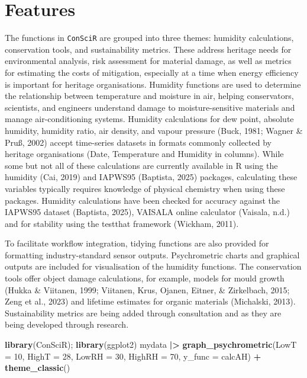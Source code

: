 \documentclass[
]{article}
\newenvironment{Shaded}{\begin{snugshade}}{\end{snugshade}}
\newcommand{\AttributeTok}[1]{\textcolor[rgb]{0.13,0.29,0.53}{#1}}
\newcommand{\DecValTok}[1]{\textcolor[rgb]{0.00,0.00,0.81}{#1}}
\newcommand{\FunctionTok}[1]{\textcolor[rgb]{0.13,0.29,0.53}{\textbf{#1}}}
\newcommand{\NormalTok}[1]{#1}
\newcommand{\SpecialCharTok}[1]{\textcolor[rgb]{0.81,0.36,0.00}{\textbf{#1}}}
\begin{document}
\section{Features}\label{features}

The functions in \texttt{ConSciR} are grouped into three themes:
humidity calculations, conservation tools, and sustainability metrics.
These address heritage needs for environmental analysis, risk assessment
for material damage, as well as metrics for estimating the costs of
mitigation, especially at a time when energy efficiency is important for
heritage organisations. Humidity functions are used to determine the
relationship between temperature and moisture in air, helping
conservators, scientists, and engineers understand damage to
moisture-sensitive materials and manage air-conditioning systems.
Humidity calculations for dew point, absolute humidity, humidity ratio,
air density, and vapour pressure (Buck, 1981; Wagner \& Pruß, 2002)
accept time-series datasets in formats commonly collected by heritage
organisations (Date, Temperature and Humidity in columns). While some
but not all of these calculations are currently available in R using the
humidity (Cai, 2019) and IAPWS95 (Baptista, 2025) packages, calculating
these variables typically requires knowledge of physical chemistry when
using these packages. Humidity calculations have been checked for
accuracy against the IAPWS95 dataset (Baptista, 2025), VAISALA online
calculator (Vaisala, n.d.) and for stability using the testthat
framework (Wickham, 2011).

To facilitate workflow integration, tidying functions are also provided
for formatting industry-standard sensor outputs. Psychrometric charts
and graphical outputs are included for visualisation of the humidity
functions. The conservation tools offer object damage calculations, for
example, models for mould growth (Hukka \& Viitanen, 1999; Viitanen,
Krus, Ojanen, Eitner, \& Zirkelbach, 2015; Zeng et al., 2023) and
lifetime estimates for organic materials (Michalski, 2013).
Sustainability metrics are being added through consultation and as they
are being developed through research.

\begin{Shaded}
\begin{Highlighting}[]
\FunctionTok{library}\NormalTok{(ConSciR); }\FunctionTok{library}\NormalTok{(ggplot2)}
\NormalTok{mydata }\SpecialCharTok{|\textgreater{}}
  \FunctionTok{graph\_psychrometric}\NormalTok{(}\AttributeTok{LowT =} \DecValTok{10}\NormalTok{, }\AttributeTok{HighT =} \DecValTok{28}\NormalTok{, }\AttributeTok{LowRH =} \DecValTok{30}\NormalTok{, }\AttributeTok{HighRH =} \DecValTok{70}\NormalTok{, }\AttributeTok{y\_func =}\NormalTok{ calcAH) }\SpecialCharTok{+} 
  \FunctionTok{theme\_classic}\NormalTok{()}
\end{Highlighting}
\end{Shaded}
\end{document}
